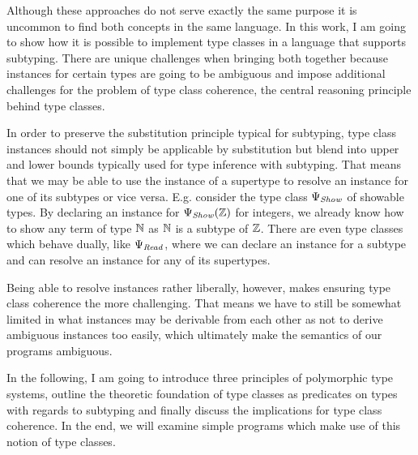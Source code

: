 Although these approaches do not serve exactly the same purpose it is uncommon to find both concepts in the same language.
In this work, I am going to show how it is possible to implement type classes in a language that supports subtyping.
There are unique challenges when bringing both together because instances for certain types are going to be ambiguous and impose additional challenges for the problem of type class coherence, the central reasoning principle behind type classes.

In order to preserve the substitution principle typical for subtyping, type class instances should not simply be applicable by substitution but blend into upper and lower bounds typically used for type inference with subtyping.
That means that we may be able to use the instance of a supertype to resolve an instance for one of its subtypes or vice versa.
E.g. consider the type class $\Psi_\mathit{Show}$ of showable types.
By declaring an instance for $\Psi_\mathit{Show}(\mathbb{Z})$ for integers, we already know how to show any term of type $\mathbb{N}$ as $\mathbb{N}$ is a subtype of $\mathbb{Z}$.
There are even type classes which behave dually, like $\Psi_\mathit{Read}$, where we can declare an instance for a subtype and can resolve an instance for any of its supertypes.

Being able to resolve instances rather liberally, however, makes ensuring type class coherence the more challenging.
That means we have to still be somewhat limited in what instances may be derivable from each other as not to derive ambiguous instances too easily, which ultimately make the semantics of our programs ambiguous.\

In the following, I am going to introduce three principles of polymorphic type systems, outline the theoretic foundation of type classes as predicates on types with regards to subtyping and finally discuss the implications for type class coherence.
In the end, we will examine simple programs which make use of this notion of type classes.
